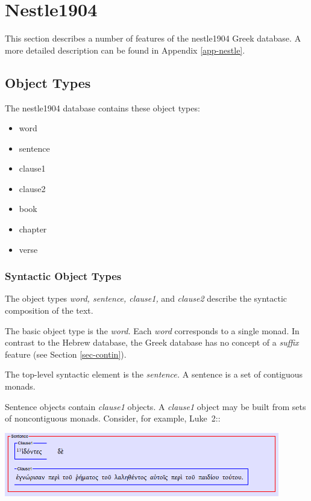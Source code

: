 \documentclass[11pt,oneside,a4paper]{memoir}
\newcommand*{\bibleref}[3]{#1~#2\thinspace:\thinspace#3}
\begin{document}
\section{Nestle1904}

This section describes a number of features of the nestle1904 Greek database. A more detailed
description can be found in Appendix \ref{app-nestle}.

\subsection{Object Types}

The nestle1904 database contains these object types:

\begin{itemize}
\item word
\item sentence
\item clause1
\item clause2
\item book
\item chapter
\item verse
\end{itemize}

\subsubsection{Syntactic Object Types}

The object types \emph{word, sentence, clause1,} and \emph{clause2} describe the syntactic
composition of the text.

The basic object type is the \emph{word.} Each \emph{word} corresponds to a single
monad. In contrast to the Hebrew database, the Greek database has no concept of a
\emph{suffix} feature (see Section \ref{sec-contin}).

The top-level syntactic element is the \emph{sentence.} A sentence is a set of
contiguous monads.

Sentence objects contain \emph{clause1} objects. A \emph{clause1} object may be built from sets of
noncontiguous monads. Consider, for example, \bibleref{Luke}{2}{17}:

\begin{center}
  \includegraphics[width=0.9\textwidth]{luke2_17.png}
\end{center}
\end{document}
